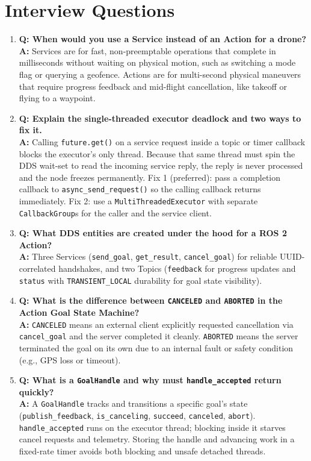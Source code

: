 \documentclass{article}
\begin{document}
\section{Interview Questions}
\begin{enumerate}
    \item \textbf{Q: When would you use a Service instead of an Action for a drone?} \\
    \textbf{A:} Services are for fast, non-preemptable operations that complete in milliseconds without waiting on physical motion, such as switching a mode flag or querying a geofence. Actions are for multi-second physical maneuvers that require progress feedback and mid-flight cancellation, like takeoff or flying to a waypoint.

    \item \textbf{Q: Explain the single-threaded executor deadlock and two ways to fix it.} \\
    \textbf{A:} Calling \texttt{future.get()} on a service request inside a topic or timer callback blocks the executor's only thread. Because that same thread must spin the DDS wait-set to read the incoming service reply, the reply is never processed and the node freezes permanently. Fix 1 (preferred): pass a completion callback to \texttt{async\_send\_request()} so the calling callback returns immediately. Fix 2: use a \texttt{MultiThreadedExecutor} with separate \texttt{CallbackGroup}s for the caller and the service client.

    \item \textbf{Q: What DDS entities are created under the hood for a ROS 2 Action?} \\
    \textbf{A:} Three Services (\texttt{send\_goal}, \texttt{get\_result}, \texttt{cancel\_goal}) for reliable UUID-correlated handshakes, and two Topics (\texttt{feedback} for progress updates and \texttt{status} with \texttt{TRANSIENT\_LOCAL} durability for goal state visibility).

    \item \textbf{Q: What is the difference between \texttt{CANCELED} and \texttt{ABORTED} in the Action Goal State Machine?} \\
    \textbf{A:} \texttt{CANCELED} means an external client explicitly requested cancellation via \texttt{cancel\_goal} and the server completed it cleanly. \texttt{ABORTED} means the server terminated the goal on its own due to an internal fault or safety condition (e.g., GPS loss or timeout).

    \item \textbf{Q: What is a \texttt{GoalHandle} and why must \texttt{handle\_accepted} return quickly?} \\
    \textbf{A:} A \texttt{GoalHandle} tracks and transitions a specific goal's state (\texttt{publish\_feedback}, \texttt{is\_canceling}, \texttt{succeed}, \texttt{canceled}, \texttt{abort}). \texttt{handle\_accepted} runs on the executor thread; blocking inside it starves cancel requests and telemetry. Storing the handle and advancing work in a fixed-rate timer avoids both blocking and unsafe detached threads.


\end{enumerate}
\end{document}
